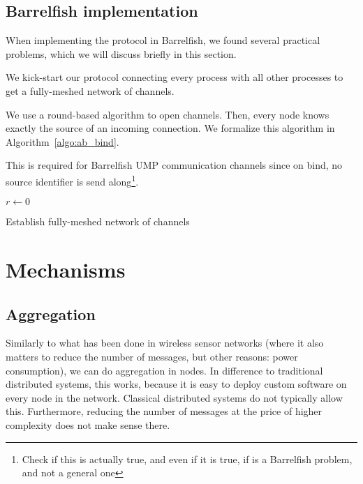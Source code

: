 \documentclass{article}
\begin{document}
\subsection{Barrelfish implementation}

When implementing the protocol in Barrelfish, we found several
practical problems, which we will discuss briefly in this section.

We kick-start our protocol connecting every process with all other
processes to get a fully-meshed network of channels.

We use a round-based algorithm to open channels. Then, every node
knows exactly the source of an incoming connection. We formalize this
algorithm in Algorithm~\ref{algo:ab_bind}.

This is required for Barrelfish UMP communication channels since on
bind, no source identifier is send along\footnote{Check if this is
  actually true, and even if it is true, if is a Barrelfish problem,
  and not a general one}.

\begin{algorithm}[H]
  \BlankLine
  \BlankLine
  $r \leftarrow 0$\;
  \caption{Establish fully-meshed network of channels}
  \label{algo:ab_bind}
\end{algorithm}

\section{Mechanisms}

\subsection{Aggregation}

Similarly to what has been done in wireless sensor networks (where it
also matters to reduce the number of messages, but other reasons:
power consumption), we can do aggregation in nodes. In difference to
traditional distributed systems, this works, because it is easy to
deploy custom software on every node in the network. Classical
distributed systems do not typically allow this. Furthermore, reducing
the number of messages at the price of higher complexity does not make
sense there.
\end{document}
